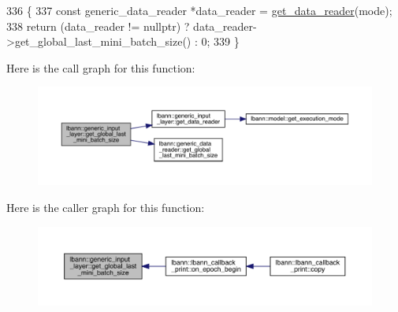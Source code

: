 \begin{DoxyCode}
336                                                                          \{
337     \textcolor{keyword}{const} generic\_data\_reader *data\_reader = \hyperlink{classlbann_1_1generic__input__layer_aba732becdb02627e3ad4493ac19e8fb6}{get\_data\_reader}(mode);
338     \textcolor{keywordflow}{return} (data\_reader != \textcolor{keyword}{nullptr}) ? data\_reader->get\_global\_last\_mini\_batch\_size() : 0;
339   \}
\end{DoxyCode}
Here is the call graph for this function\+:\nopagebreak
\begin{figure}[H]
\begin{center}
\leavevmode
\includegraphics[width=350pt]{classlbann_1_1generic__input__layer_a7ccb2e0dd8a9d9ab60e1e9d04bb80f2d_cgraph}
\end{center}
\end{figure}
Here is the caller graph for this function\+:\nopagebreak
\begin{figure}[H]
\begin{center}
\leavevmode
\includegraphics[width=350pt]{classlbann_1_1generic__input__layer_a7ccb2e0dd8a9d9ab60e1e9d04bb80f2d_icgraph}
\end{center}
\end{figure}
\mbox{\label{classlbann_1_1generic__input__layer_ac07b58c08183995852889dacfc69e459}} 
